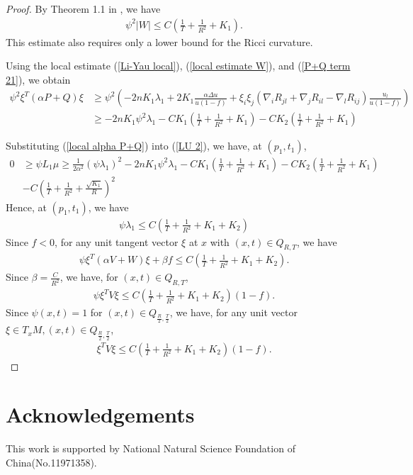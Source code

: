\documentclass{amsart}
\theoremstyle{definition}
\theoremstyle{remark}
\numberwithin{equation}{section}
\begin{document}
\begin{proof}
By Theorem 1.1 in \cite{Zhang}, we have 
\begin{align}\label{local estimate W}
\psi^2|W|\leq C(\frac{1}{T}+\frac{1}{R^2}+K_1).
\end{align}
This estimate also requires only a lower bound for the Ricci curvature.


Using the local estimate (\ref{Li-Yau local}), (\ref{local estimate W}), and (\ref{P+Q term 21}), we obtain 
\begin{align}\label{local alpha P+Q}
\psi^2\xi^{T}(\alpha P+Q)\xi&\geq \psi^2(-2nK_{1}\lambda_{1}+2K_{1}\frac{\alpha \Delta u}{u(1-f)}+\xi_{i}\xi_{j}(\nabla_{i}R_{jl}+\nabla_{j}R_{il}-\nabla_{l}R_{ij})\frac{u_{l}}{u(1-f)})\nonumber\\
&\geq -2nK_1\psi^2\lambda_1-CK_1(\frac{1}{T}+\frac{1}{R^2}+K_1)-CK_2(\frac{1}{T}+\frac{1}{R^2}+K_1)
\end{align}

Substituting (\ref{local alpha P+Q}) into (\ref{LU 2}), we have, at $(p_1,t_1)$,
\begin{align*}
0&\geq \psi L_{1}\mu\geq \frac{1}{2\alpha^{2}}(\psi \lambda_1)^{2} -2nK_1\psi^2\lambda_1-CK_1(\frac{1}{T}+\frac{1}{R^2}+K_1)-CK_2(\frac{1}{T}+\frac{1}{R^2}+K_1)\\
&-C(\frac{1}{T}+\frac{1}{R^2}+\frac{\sqrt{K_1}}{R})^2
\end{align*}
Hence, at $(p_1,t_1)$, we have
\begin{align*}
\psi \lambda_1\leq C(\frac{1}{T}+\frac{1}{R^2}+K_1+K_2)
\end{align*}
Since $f<0$, for any unit tangent vector $\xi$ at $x$ with $(x,t)\in Q_{R,T}$, we have 
\begin{align*}
\psi\xi^T(\alpha V+W)\xi+\beta f\leq C(\frac{1}{T}+\frac{1}{R^2}+K_1+K_2).
\end{align*}
Since $\beta=\frac{C}{R^2}$, we have, for $(x,t)\in Q_{R,T}$,
\begin{align*}
\psi \xi^{T}V\xi\leq C(\frac{1}{T}+\frac{1}{R^2}+K_1+K_2)(1-f).
\end{align*}
Since $\psi(x,t)=1$ for $(x,t)\in Q_{\frac{R}{2},\frac{T}{2}}$, we have, for any unit vector $\xi\in T_x M, (x,t)\in  Q_{\frac{R}{2},\frac{T}{2}}$,
\begin{align*}
\xi^{T}V\xi\leq C(\frac{1}{T}+\frac{1}{R^2}+K_1+K_2)(1-f).
\end{align*}
\end{proof}

\section{Acknowledgements}
This work is supported by National Natural Science Foundation of China(No.11971358).




\end{document}
